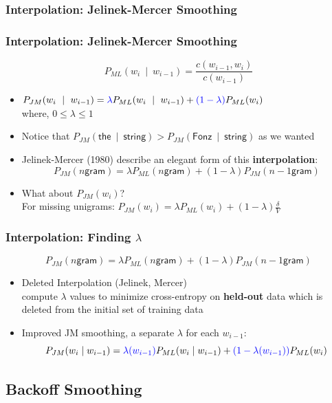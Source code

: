 \subsubsection{Interpolation: Jelinek-Mercer Smoothing}

\begin{frame}
\frametitle{Interpolation: Jelinek-Mercer Smoothing}
\[ P_{ML}(w_i~\mid~w_{i-1}) = \frac{ c(w_{i-1},w_i) } { c(w_{i-1}) } \]
\begin{itemize}[<+->]
\item $P_{JM}(w_i~\mid~w_{i-1}) = {\color{blue} \lambda} P_{ML}(w_i~\mid~w_{i-1}) +  {\color{blue} (1 - \lambda) }P_{ML}(w_{i})$ \\
 where, $0 \leq \lambda \leq 1$
\item Notice that  $P_{JM}(\textsf{the}~\mid~\textsf{string}) > P_{JM}(\textsf{Fonz}~\mid~\textsf{string})$ as we wanted
\item Jelinek-Mercer (1980) describe an elegant form of this {\bf interpolation}:
\[ P_{JM}(\textsf{$n$gram}) = \lambda P_{ML}(\textsf{$n$gram}) + (1 - \lambda) P_{JM}(\textsf{$n-1$gram}) \]
\item What about $P_{JM}(w_i)$? \\
For missing unigrams: $P_{JM}(w_i) = \lambda P_{ML}(w_i) + (1 - \lambda) \frac{\delta}{V}$
\end{itemize}
\end{frame}

\begin{frame}
\frametitle{Interpolation: Finding $\lambda$}
\[ P_{JM}(\textsf{$n$gram}) = \lambda P_{ML}(\textsf{$n$gram}) + (1 - \lambda) P_{JM}(\textsf{$n-1$gram}) \]
\begin{itemize}[<+->]
\item Deleted Interpolation (Jelinek, Mercer) \\
compute $\lambda$ values to minimize cross-entropy on {\bf held-out} data which is \alert{deleted} from the initial set of training data
\item Improved JM smoothing, a separate $\lambda$ for each $w_{i-1}$: 
\[ P_{JM}(w_i \mid w_{i-1}) = {\color{blue} \lambda(w_{i-1})} P_{ML}(w_i \mid w_{i-1}) + {\color{blue} (1 - \lambda(w_{i-1}))} P_{ML}(w_i) \]
\end{itemize}
\end{frame}

\subsection{Backoff Smoothing}

